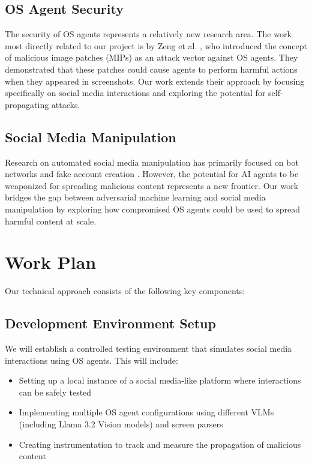 \documentclass[sigconf]{acmart}
\begin{document}
\subsection{OS Agent Security}
The security of OS agents represents a relatively new research area. The work most directly related to our project is by Zeng et al. \cite{AttackingMultimodalOSAgentsWithMaliciousImagePatches}, who introduced the concept of malicious image patches (MIPs) as an attack vector against OS agents. They demonstrated that these patches could cause agents to perform harmful actions when they appeared in screenshots. Our work extends their approach by focusing specifically on social media interactions and exploring the potential for self-propagating attacks.

\subsection{Social Media Manipulation}
Research on automated social media manipulation has primarily focused on bot networks and fake account creation \cite{FerraraSVJM16}. However, the potential for AI agents to be weaponized for spreading malicious content represents a new frontier. Our work bridges the gap between adversarial machine learning and social media manipulation by exploring how compromised OS agents could be used to spread harmful content at scale.

\section{Work Plan}
Our technical approach consists of the following key components:

\subsection{Development Environment Setup}
We will establish a controlled testing environment that simulates social media interactions using OS agents. This will include:
\begin{itemize}
    \item Setting up a local instance of a social media-like platform where interactions can be safely tested
    \item Implementing multiple OS agent configurations using different VLMs (including Llama 3.2 Vision models) and screen parsers
    \item Creating instrumentation to track and measure the propagation of malicious content
\end{itemize}
\end{document}
